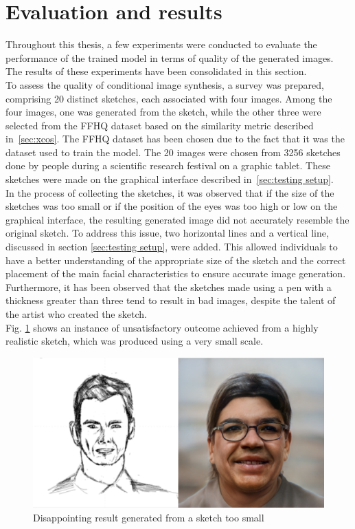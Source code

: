 \newpage
\section{Evaluation and results}
\label{sec:evaluation}
Throughout this thesis, a few experiments were conducted to evaluate the performance of the trained model in terms of quality of the generated images. The results of these experiments have been consolidated in this section.\\
To assess the quality of conditional image synthesis, a survey was prepared, comprising 20 distinct sketches, each associated with four images. Among the four images, one was generated from the sketch, while the other three were selected from the FFHQ dataset based on the similarity metric described in~\ref{sec:xcos}. The FFHQ dataset has been chosen due to the fact that it was the dataset used to train the model. The 20 images were chosen from 3256 sketches done by people during a scientific research festival on a graphic tablet. These sketches were made on the graphical interface described in~\ref{sec:testing setup}.\\
In the process of collecting the sketches, it was observed that if the size of the sketches was too small or if the position of the eyes was too high or low on the graphical interface, the resulting generated image did not accurately resemble the original sketch. To address this issue, two horizontal lines and a vertical line, discussed in section \ref{sec:testing setup}, were added. This allowed individuals to have a better understanding of the appropriate size of the sketch and the correct placement of the main facial characteristics to ensure accurate image generation. Furthermore, it has been observed that the sketches made using a pen with a thickness greater than three tend to result in bad images, despite the talent of the artist who created the sketch.\\
Fig. \ref{fig:disappointing sketch small} shows an instance of unsatisfactory outcome achieved from a highly realistic sketch, which was produced using a very small scale.
\begin{figure}[htbp]
  \centering
  \includegraphics[scale=0.15]{figures/badResult1.png}
  \caption{Disappointing result generated from a sketch too small}
  \label{fig:disappointing sketch small}
\end{figure}

